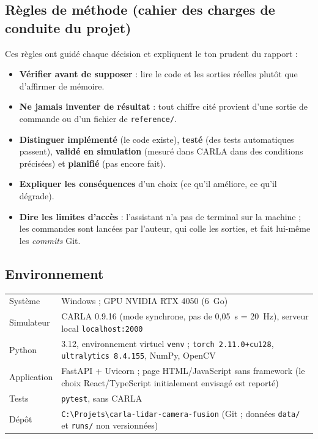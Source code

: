 \documentclass[11pt,a4paper]{article}
\newcommand{\impl}{\textcolor{warnc}{\textbf{impl\'ement\'e}}}
\newcommand{\teste}{\textcolor{accent}{\textbf{test\'e}}}
\newcommand{\valide}{\textcolor{okc}{\textbf{valid\'e en simulation}}}
\newcommand{\plan}{\textcolor{badc}{\textbf{planifi\'e}}}
\newcommand{\code}[1]{\texttt{#1}}
\begin{document}
\subsection{R\`egles de m\'ethode (cahier des charges de conduite du projet)}
Ces r\`egles ont guid\'e chaque d\'ecision et expliquent le ton prudent du rapport :
\begin{itemize}
\item \textbf{V\'erifier avant de supposer} : lire le code et les sorties r\'eelles plut\^ot que d'affirmer de m\'emoire.
\item \textbf{Ne jamais inventer de r\'esultat} : tout chiffre cit\'e provient d'une sortie de commande ou d'un fichier de \code{reference/}.
\item \textbf{Distinguer} \impl{} (le code existe), \teste{} (des tests automatiques passent), \valide{} (mesur\'e dans CARLA dans des
      conditions pr\'ecis\'ees) et \plan{} (pas encore fait).
\item \textbf{Expliquer les cons\'equences} d'un choix (ce qu'il am\'eliore, ce qu'il d\'egrade).
\item \textbf{Dire les limites d'acc\`es} : l'assistant n'a pas de terminal sur la machine ; les commandes sont lanc\'ees par l'auteur,
      qui colle les sorties, et fait lui-m\^eme les \emph{commits} Git.
\end{itemize}

\subsection{Environnement}
\begin{tabularx}{\textwidth}{lX}\toprule
Syst\`eme & Windows ; GPU NVIDIA RTX 4050 (6~Go) \\
Simulateur & CARLA 0.9.16 (mode synchrone, pas de 0,05~s = 20~Hz), serveur local \code{localhost:2000} \\
Python & 3.12, environnement virtuel \code{venv} ; \code{torch 2.11.0+cu128}, \code{ultralytics 8.4.155}, NumPy, OpenCV \\
Application & FastAPI + Uvicorn ; page HTML/JavaScript sans framework (le choix React/TypeScript initialement envisag\'e est report\'e) \\
Tests & \code{pytest}, sans CARLA \\
D\'epôt & \code{C:\textbackslash Projets\textbackslash carla-lidar-camera-fusion} (Git ; donn\'ees \code{data/} et \code{runs/} non versionn\'ees) \\
\bottomrule\end{tabularx}
\end{document}
